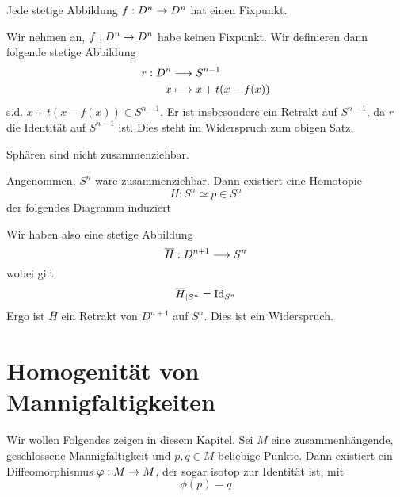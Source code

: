 Jede stetige Abbildung $f : D^n \overset{}{\rightarrow} D^n$ hat einen Fixpunkt.
\begin{Beweis}{}
	Wir nehmen an, $f : D^n \overset{}{\rightarrow} D^n$ habe keinen Fixpunkt. Wir definieren dann folgende stetige Abbildung
	\begin{align*}
	r : D^n & \overset{}{\longrightarrow} S^{n-1}\\
	x & \longmapsto x + t (x - f(x))
	\end{align*}
	s.d. $x + t(x- f(x)) \in S^{n-1}$.
Er ist insbesondere ein Retrakt auf $S^{n-1}$, da $r$ die Identität auf $S^{n-1}$ ist. Dies steht im Widerspruch zum obigen Satz.
\end{Beweis}

\Kor{}
Sphären sind nicht zusammenziehbar.
\begin{Beweis}{}
Angenommen, $S^n$ wäre zusammenziehbar. Dann existiert eine Homotopie
\[H : S^n \simeq p \in S^n\]
der folgendes Diagramm induziert
\begin{center}
\end{center}
Wir haben also eine stetige Abbildung
\[ \overline{H} : D^{n+1} \overset{}{\longrightarrow} S^n \]
wobei gilt
\[ \overline{H}_{|S^n} = \text{Id}_{S^n} \]
Ergo ist $\overline{H}$ ein Retrakt von $D^{n+1}$ auf $S^n$. Dies ist ein Widerspruch.
\end{Beweis}

\section{Homogenität von Mannigfaltigkeiten}
Wir wollen Folgendes zeigen in diesem Kapitel.
\Satz{}
\label{SatzHomogenitat}
Sei $M$ eine zusammenhängende, geschlossene Mannigfaltigkeit und $p,q \in M$ beliebige Punkte. Dann existiert ein Diffeomorphismus $\varphi:M\overset{}{\rightarrow} M$, der sogar isotop zur Identität ist, mit
\[ \phi(p) = q \]

